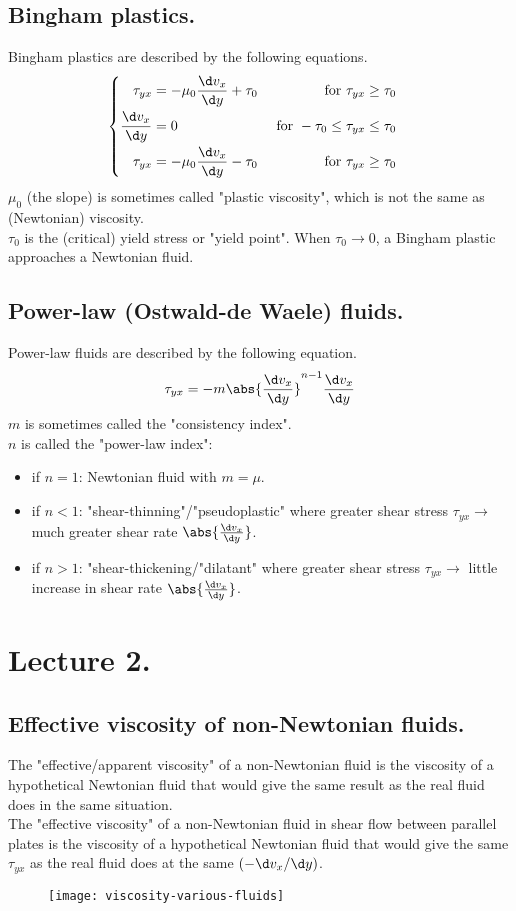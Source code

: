 \subsection{Bingham plastics.}
Bingham plastics are described by the following equations.
\[
\begin{cases}
	\begin{aligned}
		\tau_{yx}&=-\mu_0\frac{\d v_x}{\d y}+\tau_0&\ \text{for} \ \tau_{yx}\geq\tau_0\\
		\frac{\d v_x}{\d y}&=0&\ \text{for} \ -\tau_0\leq\tau_{yx}\leq\tau_0\\
		\tau_{yx}&=-\mu_0\frac{\d v_x}{\d y}-\tau_0&\ \text{for} \ \tau_{yx}\geq\-\tau_0
	\end{aligned}
\end{cases}
\]
$\mu_0$ (the slope) is sometimes called "plastic viscosity", which is not the same as (Newtonian) viscosity.\\
$\tau_0$ is the (critical) yield stress or "yield point". When $\tau_0\to0$, a Bingham plastic approaches a Newtonian fluid.

\subsection{Power-law (Ostwald-de Waele) fluids.}
Power-law fluids are described by the following equation.
\begin{align*}
	\tau_{yx}=-m\abs{\frac{\d v_x}{\d y}}^{n-1}\frac{\d v_x}{\d y}
\end{align*}
$m$ is sometimes called the "consistency index".\\
$n$ is called the "power-law index":
\begin{itemize}
	\item if $n=1$: Newtonian fluid with $m=\mu$.
	\item if $n<1$: "shear-thinning"/"pseudoplastic" where greater shear stress $\tau_{yx}\to$ much greater shear rate $\abs{\frac{\d v_x}{\d y}}$.
	\item if $n>1$: "shear-thickening/"dilatant" where greater shear stress $\tau_{yx}\to$ little increase in shear rate $\abs{\frac{\d v_x}{\d y}}$.
\end{itemize}

\section{Lecture 2.}
\subsection{Effective viscosity of non-Newtonian fluids.}
The "effective/apparent viscosity" of a non-Newtonian fluid is the viscosity of a hypothetical Newtonian fluid that would give the same result as the real fluid does in the same situation.\\
The "effective viscosity" of a non-Newtonian fluid in shear flow between parallel plates is the viscosity of a hypothetical Newtonian fluid that would give the same $\tau_{yx}$ as the real fluid does at the same $(-\d v_x/\d y)$.
\begin{figure}[H]
	\centering
	\texttt{[image: viscosity-various-fluids]}
\end{figure}

